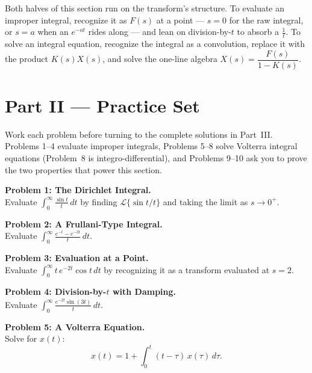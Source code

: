 \documentclass[11pt]{article}
\begin{document}
\begin{conceptbox}
Both halves of this section run on the transform's structure. To \textcolor{accentorange}{evaluate} an improper integral, recognize it as $F(s)$ at a point --- $s=0$ for the raw integral, or $s=a$ when an $e^{-at}$ rides along --- and lean on \textcolor{accentorange}{division-by-$t$} to absorb a $\frac1t$. To \textcolor{accentorange}{solve} an integral equation, recognize the integral as a \textcolor{accentorange}{convolution}, replace it with the product $K(s)X(s)$, and solve the one-line algebra $X(s) = \dfrac{F(s)}{1-K(s)}$.
\end{conceptbox}

\clearpage
{}
{}
\section*{Part II --- Practice Set}

Work each problem before turning to the complete solutions in Part~III. Problems 1--4 evaluate improper integrals, Problems 5--8 solve Volterra integral equations (Problem~8 is integro-differential), and Problems 9--10 ask you to prove the two properties that power this section.

\bigskip
\noindent\textbf{Problem 1: The Dirichlet Integral.}\\[2pt]
Evaluate $\displaystyle \int_0^\infty \frac{\sin t}{t}\,dt$ by finding $\mathcal{L}\{\sin t/t\}$ and taking the limit as $s\to0^+$.

\bigskip
\noindent\textbf{Problem 2: A Frullani-Type Integral.}\\[2pt]
Evaluate $\displaystyle \int_0^\infty \frac{e^{-t} - e^{-3t}}{t}\,dt$.

\bigskip
\noindent\textbf{Problem 3: Evaluation at a Point.}\\[2pt]
Evaluate $\displaystyle \int_0^\infty t\,e^{-2t}\cos t\,dt$ by recognizing it as a transform evaluated at $s=2$.

\bigskip
\noindent\textbf{Problem 4: Division-by-$t$ with Damping.}\\[2pt]
Evaluate $\displaystyle \int_0^\infty \frac{e^{-2t}\sin(3t)}{t}\,dt$.

\bigskip
\noindent\textbf{Problem 5: A Volterra Equation.}\\[2pt]
Solve for $x(t)$:
\[ x(t) = 1 + \int_0^t (t-\tau)\,x(\tau)\,d\tau. \]
\end{document}
